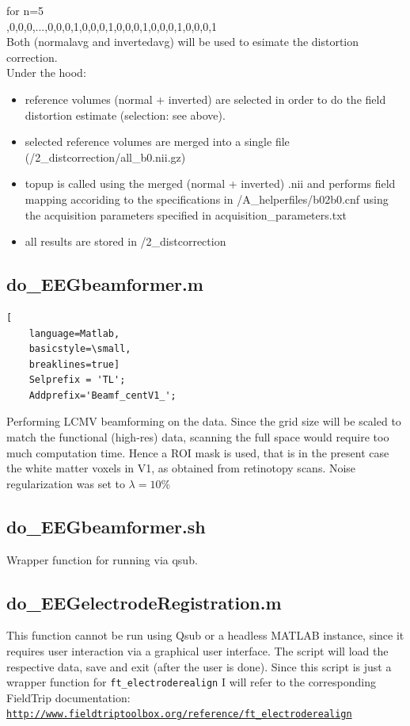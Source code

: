 \documentclass[12pt,a4paper]{scrartcl}
\begin{document}
\noindent for n=5\\

,0,0,0,...,0,0,0,1,0,0,0,1,0,0,0,1,0,0,0,1,0,0,0,1\\

\noindent Both (normalavg and invertedavg) will be used to esimate the distortion correction.\\

\noindent Under the hood:
\begin{itemize}
\item reference volumes (normal + inverted) are selected in order to do the field distortion estimate (selection: see above).
\item selected reference volumes are merged into a single file (/2\_distcorrection/all\_b0.nii.gz)
\item topup is called using the merged (normal + inverted) .nii and performs field mapping accoriding to the specifications in /A\_helperfiles/b02b0.cnf using the acquisition parameters specified in acquisition\_parameters.txt
\item all results are stored in /2\_distcorrection
\end{itemize}

\subsection{do\_EEGbeamformer.m}
\label{m:beamf}
\begin{lstlisting}[
    language=Matlab,
    basicstyle=\small,
    breaklines=true]
    Selprefix = 'TL';
    Addprefix='Beamf_centV1_';
\end{lstlisting}
Performing LCMV beamforming on the data. Since the grid size will be scaled to match the functional (high-res) data, scanning the full space would require too much computation time. Hence a ROI mask is used, that is in the present case the white matter voxels in V1, as obtained from retinotopy scans. Noise regularization was set to $\lambda=10\%$\\

\subsection{do\_EEGbeamformer.sh}
\label{sh:beamf}
Wrapper function for running \texttt{} via qsub.\\

\subsection{do\_EEGelectrodeRegistration.m}
\label{m:elecReg}
This function cannot be run using Qsub or a headless MATLAB instance, since it requires user interaction via a graphical user interface. The script will load the respective data, save and exit (after the user is done). Since this script is just a wrapper function for \texttt{ft\_electroderealign} I will refer to the corresponding FieldTrip documentation: \href{http://www.fieldtriptoolbox.org/reference/ft\_electroderealign}{\nolinkurl{http://www.fieldtriptoolbox.org/reference/ft\_electroderealign}}\\
\end{document}
